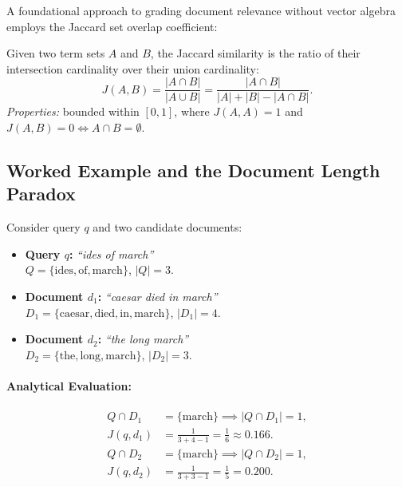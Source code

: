 A foundational approach to grading document relevance without vector algebra employs the Jaccard set overlap coefficient:

\begin{definition}
Given two term sets $A$ and $B$, the Jaccard similarity is the ratio of their intersection cardinality over their union cardinality:
\begin{equation}
J(A, B) = \frac{|A \cap B|}{|A \cup B|} = \frac{|A \cap B|}{|A| + |B| - |A \cap B|}.
\end{equation}
\textit{Properties:} bounded within $[0, 1]$, where $J(A, A) = 1$ and $J(A, B) = 0 \iff A \cap B = \emptyset$.
\end{definition}

\subsection{Worked Example and the Document Length Paradox}

Consider query $q$ and two candidate documents:
\begin{itemize}
    \item \textbf{Query $q$:} \textit{``ides of march''}\\
    $Q = \{\text{ides}, \text{of}, \text{march}\}$, $|Q| = 3$.
    \item \textbf{Document $d_1$:} \textit{``caesar died in march''}\\
    $D_1 = \{\text{caesar}, \text{died}, \text{in}, \text{march}\}$, $|D_1| = 4$.
    \item \textbf{Document $d_2$:} \textit{``the long march''}\\
    $D_2 = \{\text{the}, \text{long}, \text{march}\}$, $|D_2| = 3$.
\end{itemize}

\paragraph{Analytical Evaluation:}
\begin{align}
Q \cap D_1 &= \{\text{march}\} \implies |Q \cap D_1| = 1, \\
J(q, d_1) &= \frac{1}{3 + 4 - 1} = \frac{1}{6} \approx 0.166. \\[0.2cm]
Q \cap D_2 &= \{\text{march}\} \implies |Q \cap D_2| = 1, \\
J(q, d_2) &= \frac{1}{3 + 3 - 1} = \frac{1}{5} = 0.200.
\end{align}

